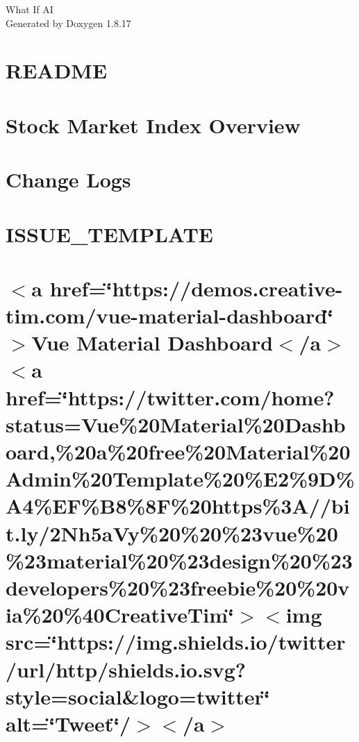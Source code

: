 \let\mypdfximage\pdfximage\def\pdfximage{\immediate\mypdfximage}\documentclass[twoside]{book}
\newcommand{\+}{\discretionary{\mbox{\scriptsize$\hookleftarrow$}}{}{}}
\newcommand{\clearemptydoublepage}{%
  \newpage{\pagestyle{empty}\cleardoublepage}%
}
\begin{document}
\hypersetup{pageanchor=false,
             bookmarksnumbered=true,
             pdfencoding=unicode
            }
\begin{titlepage}
\vspace*{7cm}
\begin{center}%
{\Large What If AI }\\
\vspace*{1cm}
{\large Generated by Doxygen 1.8.17}\\
\end{center}
\end{titlepage}
\clearemptydoublepage
{}
\tableofcontents
\clearemptydoublepage
{}
\hypersetup{pageanchor=true}

\chapter{R\+E\+A\+D\+ME}
\label{md_README}

\chapter{Stock Market Index Overview}
\label{md_src_data_management_financeAbbreviations}

\chapter{Change Logs}
\label{md_src_webinterface_clean-frontend_CHANGELOG}

\chapter{I\+S\+S\+U\+E\+\_\+\+T\+E\+M\+P\+L\+A\+TE}
\label{md_src_webinterface_clean-frontend_ISSUE_TEMPLATE}

\chapter{$<$a href=\char`\"{}https\+://demos.\+creative-\/tim.\+com/vue-\/material-\/dashboard\char`\"{}$>$Vue Material Dashboard$<$/a$>$ $<$a href=\char`\"{}https\+://twitter.\+com/home?status=\+Vue\%20\+Material\%20\+Dashboard,\%20a\%20free\%20\+Material\%20\+Admin\%20\+Template\%20\%\+E2\%9\+D\%\+A4\%\+E\+F\%\+B8\%8\+F\%20https\%3\+A//bit.\+ly/2\+Nh5a\+Vy\%20\%20\%23vue\%20\%23material\%20\%23design\%20\%23developers\%20\%23freebie\%20\%20via\%20\%40\+Creative\+Tim\char`\"{}$>$$<$img src=\char`\"{}https\+://img.\+shields.\+io/twitter/url/http/shields.\+io.\+svg?style=social\&logo=twitter\char`\"{} alt=\char`\"{}\+Tweet\char`\"{}/$>$$<$/a$>$}
\label{md_src_webinterface_clean-frontend_README}

\end{document}
